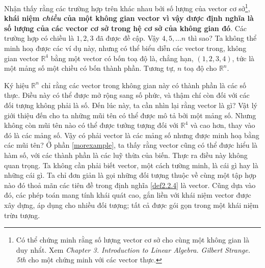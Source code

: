Nhận thấy rằng các trường hợp trên khác nhau bởi số lượng của vector cơ sở\footnote{Có thể chứng minh rằng số lượng vector cơ sở cho cùng một không gian là duy nhẩt. Xem \emph{Chapter 3. Introduction to Linear Algebra. Gilbert Strange. 5th} cho một chứng minh với các vector thực.}, \textbf{khái niệm \emph{chiều} của một không gian vector vì vậy dược định nghĩa là số lượng của các vector cơ sở trong hệ cơ sở của không gian đó}. Các trường hợp có chiều là \(1,2,3\) đã được đề cập. Vậy \(4,5,\dots n\) thì sao? Ta không thể minh hoạ được các ví dụ này, nhưng có thể biểu diễn các vector trong, không gian vector \(\mathbb{R}^4\) bằng một vector có bốn toạ độ là, chẳng hạn, \((1,2,3,4)\), tức là một mảng số một chiều có bốn thành phần. Tương tự, \(n\) toạ độ cho \(\mathbb{R}^n\).
\vspace{8pt}

Ký hiệu \(\mathbb{R}^n\) chỉ rằng các vector trong không gian này có thành phần là các số thực. Điều này có thể được mở rộng sang số phức, và thậm chí còn đối với các đối tượng không phải là số. Đến lúc này, ta cần nhìn lại rằng vector là gì? Vật lý giới thiệu đến cho ta những mũi tên có thể được mô tả bởi một mảng số. Nhưng không còn mũi tên nào có thể được tưởng tượng đối với 
\(\mathbb{R}^4\) và cao hơn, thay vào đó là các mảng số. Vậy có phải vector là các mảng số nhưng được minh hoạ bằng các mũi tên? Ở phần \ref{morexample}, ta thấy rằng vector cũng có thể được hiểu là hàm số, với các thành phần là các luỹ thừa của biến. Thực ra điều này không quan trọng. 
Ta không cần phải biết vector, một cách tường minh, là cái gì hay là những cái gì. Ta chỉ đơn giản là gọi những đối tượng thuộc về cùng một tập hợp nào đó thoả mãn các tiên đề trong định nghĩa \ref{def2.2.4} là vector. Cũng dựa vào đó, các phép toán mang tính khái quát cao, gắn liền với khái niệm vector được xây dựng, áp dụng cho nhiều đối tượng; tất cả được gói gọn trong một khái niệm trừu tượng.

